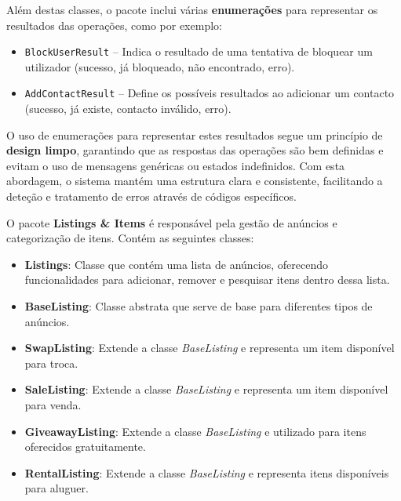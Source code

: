 \documentclass[a4paper, 12pt]{article} %
\begin{document}
Além destas classes, o pacote inclui várias \textbf{enumerações} para representar os resultados das operações, como por exemplo:

\begin{itemize}
	\item \texttt{BlockUserResult} – Indica o resultado de uma tentativa de bloquear um utilizador (sucesso, já bloqueado, não encontrado, erro).
	\item \texttt{AddContactResult} – Define os possíveis resultados ao adicionar um contacto (sucesso, já existe, contacto inválido, erro).
\end{itemize}

O uso de enumerações para representar estes resultados segue um princípio de \textbf{design limpo}, garantindo que as respostas das operações são bem definidas e evitam o uso de mensagens genéricas ou estados indefinidos. Com esta abordagem, o sistema mantém uma estrutura clara e consistente, facilitando a deteção e tratamento de erros através de códigos específicos.



O pacote \textbf{Listings \& Items} é responsável pela gestão de anúncios e categorização de itens. Contém as seguintes classes:

\begin{itemize}
	\item \textbf{Listings}: Classe que contém uma lista de anúncios, oferecendo funcionalidades para adicionar, remover e pesquisar itens dentro dessa lista.
	\item \textbf{BaseListing}: Classe abstrata que serve de base para diferentes tipos de anúncios.
	\item \textbf{SwapListing}: Extende a classe \textit{BaseListing} e representa um item disponível para troca.
	\item \textbf{SaleListing}: Extende a classe \textit{BaseListing} e representa um item disponível para venda.
	\item \textbf{GiveawayListing}: Extende a classe \textit{BaseListing} e utilizado para itens oferecidos gratuitamente.
	\item \textbf{RentalListing}: Extende a classe \textit{BaseListing} e representa itens disponíveis para aluguer.
\end{itemize}
\end{document}
